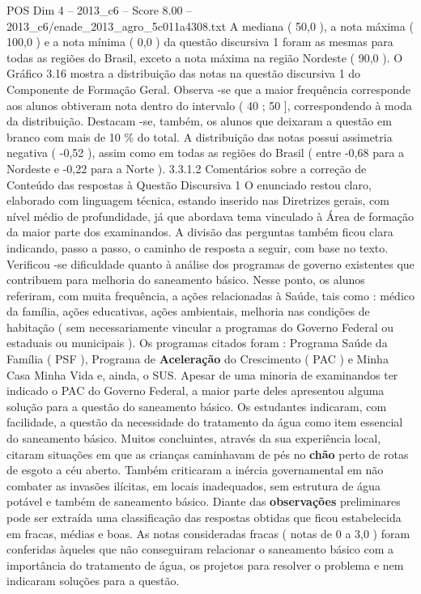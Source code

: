 \begin{textsample}{POS Dim 4 – 2013\_c6 – Score 8.00 – 2013\_c6/enade\_2013\_agro\_5c011a4308.txt}
A mediana ( 50,0 ), a nota máxima ( 100,0 ) e a nota mínima ( 0,0 ) da questão discursiva 1 foram as mesmas para todas as regiões do Brasil, exceto a nota máxima na região Nordeste ( 90,0 ).
O Gráfico 3.16 mostra a distribuição das notas na questão discursiva 1 do Componente de Formação Geral.
Observa -se que a maior frequência corresponde aos alunos obtiveram nota dentro do intervalo ( 40 ; 50 ], correspondendo à moda da distribuição.
Destacam -se, também, os alunos que deixaram a questão em branco com mais de 10 \% do total.
A distribuição das notas possui assimetria negativa ( -0,52 ), assim como em todas as regiões do Brasil ( entre -0,68 para a Nordeste e -0,22 para a Norte ). 3.3.1.2 Comentários sobre a correção de Conteúdo das respostas à Questão Discursiva 1 O enunciado restou claro, elaborado com linguagem técnica, estando inserido nas Diretrizes gerais, com nível médio de profundidade, já que abordava tema vinculado à Área de formação da maior parte dos examinandos.
A divisão das perguntas também ficou clara indicando, passo a passo, o caminho de resposta a seguir, com base no texto.
Verificou -se dificuldade quanto à análise dos programas de governo existentes que contribuem para melhoria do saneamento básico.
Nesse ponto, os alunos referiram, com muita frequência, a ações relacionadas à Saúde, tais como : médico da família, ações educativas, ações ambientais, melhoria nas condições de habitação ( sem necessariamente vincular a programas do Governo Federal ou estaduais ou municipais ).
Os programas citados foram : Programa Saúde da Família ( PSF ), Programa de \textbf{Aceleração} do Crescimento ( PAC ) e Minha Casa Minha Vida e, ainda, o SUS.
Apesar de uma minoria de examinandos ter indicado o PAC do Governo Federal, a maior parte deles apresentou alguma solução para a questão do saneamento básico.
Os estudantes indicaram, com facilidade, a questão da necessidade do tratamento da água como item essencial do saneamento básico.
Muitos concluintes, através da sua experiência local, citaram situações em que as crianças caminhavam de pés no \textbf{chão} perto de rotas de esgoto a céu aberto.
Também criticaram a inércia governamental em não combater as invasões ilícitas, em locais inadequados, sem estrutura de água potável e também de saneamento básico.
Diante das \textbf{observações} preliminares pode ser extraída uma classificação das respostas obtidas que ficou estabelecida em fracas, médias e boas.
As notas consideradas fracas ( notas de 0 a 3,0 ) foram conferidas àqueles que não conseguiram relacionar o saneamento básico com a importância do tratamento de água, os projetos para resolver o problema e nem indicaram soluções para a questão.

\end{textsample}
